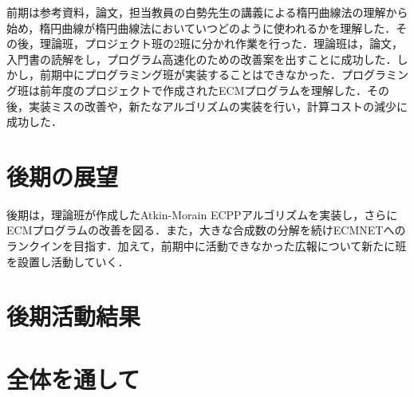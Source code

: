 \documentclass[openany,11pt,papersize]{jsbook}
\begin{document}
前期は参考資料，論文，担当教員の白勢先生の講義による楕円曲線法の理解から始め，楕円曲線が楕円曲線法においていつどのように使われるかを理解した．その後，理論班，プロジェクト班の2班に分かれ作業を行った．理論班は，論文，入門書の読解をし，プログラム高速化のための改善案を出すことに成功した．しかし，前期中にプログラミング班が実装することはできなかった．プログラミング班は前年度のプロジェクトで作成されたECMプログラムを理解した．その後，実装ミスの改善や，新たなアルゴリズムの実装を行い，計算コストの減少に成功した．


\section{後期の展望}

後期は，理論班が作成したAtkin-Morain ECPPアルゴリズムを実装し，さらにECMプログラムの改善を図る．また，大きな合成数の分解を続けECMNETへのランクインを目指す．加えて，前期中に活動できなかった広報について新たに班を設置し活動していく．


\section{後期活動結果}


\section{全体を通して}




\end{document}
